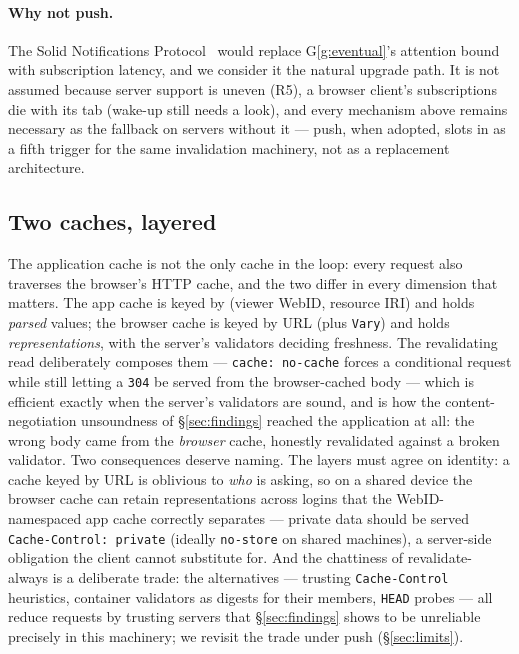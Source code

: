 \documentclass[11pt,a4paper]{article}
\theoremstyle{remark}
\newcommand{\code}[1]{\texttt{#1}}
\begin{document}
\paragraph{Why not push.} The Solid Notifications
Protocol~\cite{solid-notifications} would replace G\ref{g:eventual}'s attention
bound with subscription latency, and we consider it the natural upgrade path.
It is not assumed because server support is uneven (R5), a browser client's
subscriptions die with its tab (wake-up still needs a look), and every
mechanism above remains necessary as the fallback on servers without it ---
push, when adopted, slots in as a fifth trigger for the same invalidation
machinery, not as a replacement architecture.

\subsection{Two caches, layered}\label{sec:twocaches}

The application cache is not the only cache in the loop: every request also
traverses the browser's HTTP cache, and the two differ in every dimension that
matters. The app cache is keyed by (viewer WebID, resource IRI) and holds
\emph{parsed} values; the browser cache is keyed by URL (plus \code{Vary}) and
holds \emph{representations}, with the server's validators deciding freshness.
The revalidating read deliberately composes them --- \code{cache: no-cache}
forces a conditional request while still letting a \code{304} be served from
the browser-cached body --- which is efficient exactly when the server's
validators are sound, and is how the content-negotiation unsoundness of
\S\ref{sec:findings} reached the application at all: the wrong body came from
the \emph{browser} cache, honestly revalidated against a broken validator. Two
consequences deserve naming. The layers must agree on identity: a cache keyed
by URL is oblivious to \emph{who} is asking, so on a shared device the browser
cache can retain representations across logins that the WebID-namespaced app
cache correctly separates --- private data should be served
\code{Cache-Control: private} (ideally \code{no-store} on shared machines), a
server-side obligation the client cannot substitute for. And the chattiness of
revalidate-always is a deliberate trade: the alternatives --- trusting
\code{Cache-Control} heuristics, container validators as digests for their
members, \code{HEAD} probes --- all reduce requests by trusting servers that
\S\ref{sec:findings} shows to be unreliable precisely in this machinery; we
revisit the trade under push (\S\ref{sec:limits}).
\end{document}
